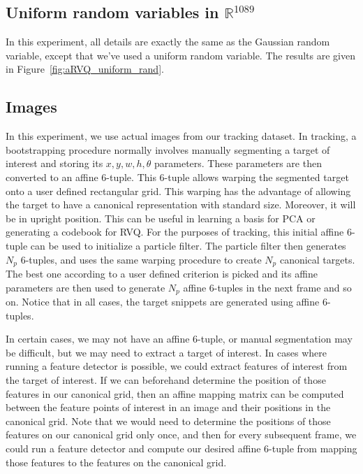 \subsection{Uniform random variables in $\mathbb{R}^{1089}$}
In this experiment, all details are exactly the same as the Gaussian random variable, except that we've used a uniform random variable.  The results are given in Figure~\ref{fig:aRVQ_uniform_rand}.





\subsection{Images}
In this experiment, we use actual images from our tracking dataset.  In tracking, a bootstrapping procedure normally involves manually segmenting a target of interest and storing its $x, y, w, h, \theta$ parameters.  These parameters are then converted to an affine 6-tuple.  This 6-tuple allows warping the segmented target onto a user defined rectangular grid.  This warping has the advantage of allowing the target to have a canonical representation with standard size.  Moreover, it will be in upright position.  This can be useful in learning a basis for PCA or generating a codebook for RVQ.  For the purposes of tracking, this initial affine 6-tuple can be used to initialize a particle filter.  The particle filter then generates $N_p$ 6-tuples, and uses the same warping procedure to create $N_p$ canonical targets.  The best one according to a user defined criterion is picked and its affine parameters are then used to generate $N_p$ affine 6-tuples in the next frame and so on.  Notice that in all cases, the target snippets are generated using affine 6-tuples.



In certain cases, we may not have an affine 6-tuple, or manual segmentation may be difficult, but we may need to extract a target of interest.  In cases where running a feature detector is possible, we could extract features of interest from the target of interest.  If we can beforehand determine the position of those features in our canonical grid, then an affine mapping matrix can be computed between the feature points of interest in an image and their positions in the canonical grid.  Note that we would need to determine the positions of those features on our canonical grid only once, and then for every subsequent frame, we could run a feature detector and compute our desired  affine 6-tuple from mapping those features to the features on the canonical grid.

